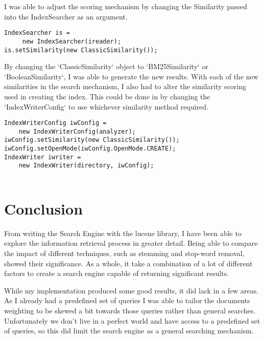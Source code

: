 I was able to adjust the scoring mechanism by changing the Similarity passed into the IndexSearcher as an argument.
\begin{lstlisting}
IndexSearcher is = 
	 new IndexSearcher(ireader);
is.setSimilarity(new ClassicSimilarity());
\end{lstlisting}
By changing the `ClassicSimilarity` object to `BM25Similarity` or `BooleanSimilarity`, I was able to generate the new results. With each of the new similarities in the search mechanism, I also had to alter the similarity scoring used in creating the index. This could be done in by changing the `IndexWriterConfig` to use whichever similarity method required. 
\begin{lstlisting}
IndexWriterConfig iwConfig = 
	new IndexWriterConfig(analyzer);
iwConfig.setSimilarity(new ClassicSimilarity());
iwConfig.setOpenMode(iwConfig.OpenMode.CREATE);
IndexWriter iwriter = 
	new IndexWriter(directory, iwConfig);
	
\end{lstlisting}
\newpage

\section{Conclusion}
From writing the Search Engine with the lucene library, I have been able to explore the information retrieval process in greater detail. Being able to compare the impact of different techniques, such as stemming and stop-word removal, showed their significance. As a whole, it take a combination of a lot of different factors to create a search engine capable of returning significant results. \par
While my implementation produced some good results, it did lack in a few areas. As I already had a predefined set of queries I was able to tailor the documents weighting to be skewed a bit towards those queries rather than general searches. Unfortunately we don't live in a perfect world and have access to a predefined set of queries, so this did limit the search engine as a general searching mechanism. 
  

